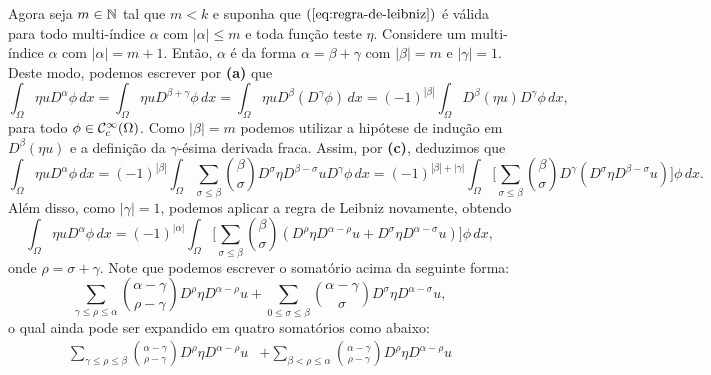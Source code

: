 \begin{prf}
    Agora seja $m \in \mathbb{N}$ tal que $m < k$ e suponha que $(\ref{eq:regra-de-leibniz})$ é válida para todo multi-índice $\alpha$ com $|\alpha| \leqslant m$ e toda função teste $\eta$.
    Considere um multi-índice $\alpha$ com $|\alpha| = m + 1$.
    Então, $\alpha$ é da forma $\alpha = \beta + \gamma$ com $|\beta| = m$ e $|\gamma| = 1$. 
    Deste modo, podemos escrever por \textbf{(a)} que
    \[
        \int_\Omega \eta u D^{\alpha}\phi \, dx = \int_\Omega \eta u D^{\beta + \gamma}\phi \, dx = \int_\Omega \eta u D^\beta(D^\gamma \phi) \, dx = (-1)^{|\beta|} \int_\Omega D^{\beta} (\eta u) D^{\gamma}\phi \,dx,
    \]
    para todo $\phi \in \mathcal{C}^{\infty}_c(\Omega)$.
    Como $|\beta| = m$ podemos utilizar a hipótese de indução em $D^{\beta}(\eta u)$ e a definição da $\gamma$-ésima derivada fraca. Assim, por \textbf{(c)}, deduzimos que
    {\small
    \[
        \int_\Omega \eta u D^{\alpha}\phi \, dx = (-1)^{|\beta|} \int_\Omega \sum_{\sigma \leqslant \beta} \binom{\beta}{\sigma} D^{\sigma} \eta D^{\beta - \sigma} u D^{\gamma}\phi \, dx = (-1)^{|\beta| + |\gamma|} \int_\Omega \bigg[\sum_{\sigma \leqslant \beta} \binom{\beta}{\sigma} D^{\gamma}(D^{\sigma} \eta D^{\beta - \sigma} u)\bigg] \phi \, dx.
    \]}\!
    Além disso, como $|\gamma| = 1$, podemos aplicar a regra de Leibniz novamente, obtendo
    \begin{equation} \label{eq:integral-etau}
        \int_\Omega \eta u D^{\alpha}\phi \, dx = (-1)^{|\alpha|} \int_\Omega \bigg[\sum_{\sigma \leqslant \beta} \binom{\beta}{\sigma} \left(D^{\rho}\eta D^{\alpha - \rho} u + D^{\sigma} \eta D^{\alpha - \sigma} u\right)\bigg] \phi \,dx,
    \end{equation}
    onde $\rho = \sigma + \gamma$. 
    Note que podemos escrever o somatório acima da seguinte forma:
    \begin{equation*} \label{eq:somatorio}
        \sum_{\gamma \leqslant \rho \leqslant \alpha} \binom{\alpha - \gamma}{\rho - \gamma} D^{\rho}\eta D^{\alpha - \rho} u + \sum_{0 \leqslant\sigma \leqslant \beta} \binom{\alpha - \gamma}{\sigma} D^{\sigma} \eta D^{\alpha - \sigma} u,
    \end{equation*}
    o qual ainda pode ser expandido em quatro somatórios como abaixo:
    \begin{equation} \label{eq:somatorio-2}
        \begin{aligned}
            \sum_{\gamma \leqslant \rho \leqslant \beta} \binom{\alpha - \gamma}{\rho - \gamma} D^{\rho}\eta D^{\alpha - \rho} u &+ \sum_{\beta < \rho \leqslant \alpha} \binom{\alpha - \gamma}{\rho - \gamma} D^{\rho}\eta D^{\alpha - \rho} u \\

\end{aligned}
\end{equation}
\end{prf}
